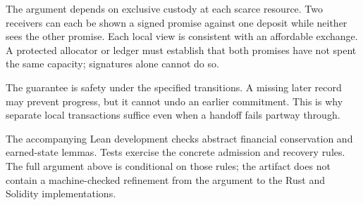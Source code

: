 The argument depends on exclusive custody at each scarce resource. Two
receivers can each be shown a signed promise against one deposit while neither
sees the other promise. Each local view is consistent with an affordable
exchange. A protected allocator or ledger must establish that both promises
have not spent the same capacity; signatures alone cannot do so.

The guarantee is safety under the specified transitions. A missing later record
may prevent progress, but it cannot undo an earlier commitment. This is why
separate local transactions suffice even when a handoff fails partway through.

The accompanying Lean development checks abstract financial conservation and
earned-state lemmas. Tests exercise the concrete admission and recovery rules.
The full argument above is conditional on those rules; the artifact does not
contain a machine-checked refinement from the argument to the Rust and Solidity
implementations.
